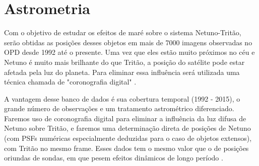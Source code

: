\documentclass[12pt,a4paper]{report}
\begin{document}
%




\section{Astrometria}
\label{Sec: Netuno-mares}

\indent \indent Com o objetivo de estudar os efeitos de maré sobre o sistema Netuno-Tritão, serão obtidas as posições desses objetos em mais de 7000 imagens observadas no OPD desde 1992 até o presente. Uma vez que eles estão muito próximos no céu e Netuno é muito mais brilhante do que Tritão, a posição do satélite pode estar afetada pela luz do planeta. Para eliminar essa influência será utilizada uma técnica chamada de "coronografia digital" \citep{Assafin2009}.

A vantagem desse banco de dados é sua cobertura temporal (1992 - 2015), o grande número de observações e um tratamento astrométrico diferenciado. Faremos uso de coronografia digital para eliminar a influência da luz difusa de Netuno sobre Tritão, e faremos uma determinação direta de posições de Netuno (com PSFs numéricas especialmente deduzidas para o caso de objetos extensos), com Tritão no mesmo frame. Esses dados tem o mesmo valor que o de posições oriundas de sondas, em que pesem efeitos dinâmicos de longo período \citep{Lainey2012}.
\end{document}
